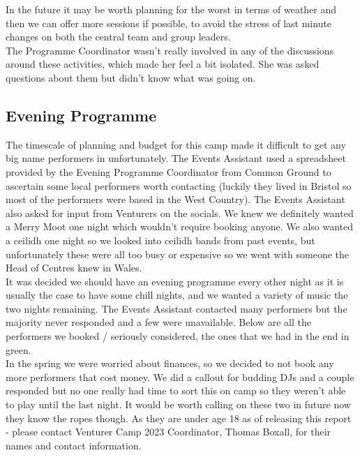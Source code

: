 In the future it may be worth planning for the worst in terms of weather and then we can offer more sessions if possible, to avoid the stress of last minute changes on both the central team and group leaders.\\

The Programme Coordinator wasn't really involved in any of the discussions around these activities, which made her feel a bit isolated. She was asked questions about them but didn't know what was going on.
\subsection{Evening Programme}
The timescale of planning and budget for this camp made it difficult to get any big name performers in unfortunately. The Events Assistant used a spreadsheet provided by the Evening Programme Coordinator from Common Ground to ascertain some local performers worth contacting (luckily they lived in Bristol so most of the performers were based in the West Country). The Events Assistant also asked for input from Venturers on the socials. We knew we definitely wanted a Merry Moot one night which wouldn't require booking anyone. We also wanted a ceilidh one night so we looked into ceilidh bands from past events, but unfortunately these were all too busy or expensive so we went with someone the Head of Centres knew in Wales.\\

It was decided we should have an evening programme every other night as it is usually the case to have some chill nights, and we wanted a variety of music the two nights remaining. The Events Assistant contacted many performers but the majority never responded and a few were unavailable. Below are all the performers we booked / seriously considered, the ones that we had in the end in green.\\

In the spring we were worried about finances, so we decided to not book any more performers that cost money. We did a callout for budding DJs and a couple responded but no one really had time to sort this on camp so they weren't able to play until the last night. It would be worth calling on these two in future now they know the ropes though. As they are under age 18 as of releasing this report - please contact Venturer Camp 2023 Coordinator, Thomas Boxall, for their names and contact information. 

